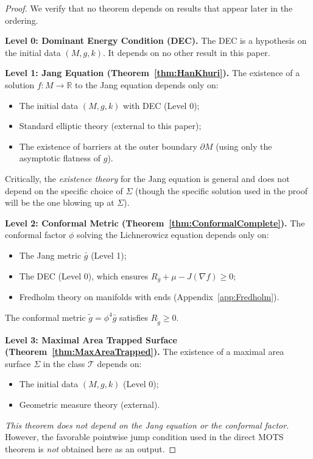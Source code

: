 \begin{proof}
We verify that no theorem depends on results that appear later in the ordering.

\textbf{Level 0: Dominant Energy Condition (DEC).}
The DEC is a hypothesis on the initial data $(M, g, k)$. It depends on no other result in this paper.

\textbf{Level 1: Jang Equation (Theorem~\ref{thm:HanKhuri}).}
The existence of a solution $f: M \to \mathbb{R}$ to the Jang equation depends only on:
\begin{itemize}
    \item The initial data $(M, g, k)$ with DEC (Level 0);
    \item Standard elliptic theory (external to this paper);
    \item The existence of barriers at the outer boundary $\partial M$ (using only the asymptotic flatness of $g$).
\end{itemize}
Critically, the \emph{existence theory} for the Jang equation is general and does not depend on the specific choice of $\Sigma$ (though the specific solution used in the proof will be the one blowing up at $\Sigma$).

\textbf{Level 2: Conformal Metric (Theorem~\ref{thm:ConformalComplete}).}
The conformal factor $\phi$ solving the Lichnerowicz equation depends only on:
\begin{itemize}
    \item The Jang metric $\bar{g}$ (Level 1);
    \item The DEC (Level 0), which ensures $R_{\bar{g}} + \mu - J(\nabla f) \ge 0$;
    \item Fredholm theory on manifolds with ends (Appendix~\ref{app:Fredholm}).
\end{itemize}
The conformal metric $\tilde{g} = \phi^4 \bar{g}$ satisfies $R_{\tilde{g}} \ge 0$.

\textbf{Level 3: Maximal Area Trapped Surface (Theorem~\ref{thm:MaxAreaTrapped}).}
The existence of a maximal area surface $\Sigma$ in the class $\mathcal{T}$ depends on:
\begin{itemize}
    \item The initial data $(M, g, k)$ (Level 0);
    \item Geometric measure theory (external).
\end{itemize}
\emph{This theorem does not depend on the Jang equation or the conformal factor.} However, the favorable pointwise jump condition used in the direct MOTS theorem is \emph{not} obtained here as an output.


\end{proof}
